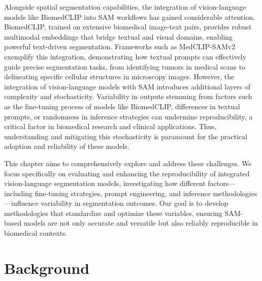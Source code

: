 \documentclass[./dissertation.tex]{subfiles}
\begin{document}

Alongside spatial segmentation capabilities, the integration of vision-language models like BiomedCLIP \cite{zhang2023biomedclip} into SAM workflows has gained considerable attention. BiomedCLIP, trained on extensive biomedical image-text pairs, provides robust multimodal embeddings that bridge textual and visual domains, enabling powerful text-driven segmentation. Frameworks such as MedCLIP-SAMv2 exemplify this integration, demonstrating how textual prompts can effectively guide precise segmentation tasks, from identifying tumors in medical scans to delineating specific cellular structures in microscopy images. However, the integration of vision-language models with SAM introduces additional layers of complexity and stochasticity. Variability in outputs stemming from factors such as the fine-tuning process of models like BiomedCLIP, differences in textual prompts, or randomness in inference strategies can undermine reproducibility, a critical factor in biomedical research and clinical applications. Thus, understanding and mitigating this stochasticity is paramount for the practical adoption and reliability of these models.


This chapter aims to comprehensively explore and address these challenges. We focus specifically on evaluating and enhancing the reproducibility of integrated vision-language segmentation models, investigating how different factors—including fine-tuning strategies, prompt engineering, and inference methodologies—influence variability in segmentation outcomes. Our goal is to develop methodologies that standardize and optimize these variables, ensuring SAM-based models are not only accurate and versatile but also reliably reproducible in biomedical contexts.

\section{Background}
\end{document}
